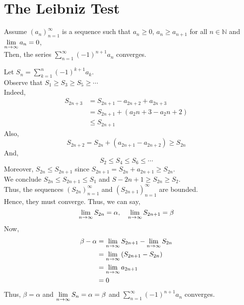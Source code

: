 \documentclass[12pt]{article}
\begin{document}
\section{The Leibniz Test}
\begin{theo}{}
Assume \(\left(a_n\right)_{n=1}^\infty\) is a sequence such that \(a_n \ge 0\), \(a_n \ge a_{n+1}\) for all \(n\in \mathbb N\) and \(\displaystyle\lim_{n\to\infty} a_n = 0\),\\
Then, the series \(\displaystyle\sum_{n=1}^\infty(-1)^{n+1}a_n\) converges.\\   
\end{theo}
\newpage
\begin{prf}{}
Let \(S_n  = \displaystyle\sum_{k=1}^n(-1)^{k+1}a_k\).\\
Observe that \(S_1 \ge S_3 \ge S_5 \ge \cdots\)\\
Indeed, 
\begin{align*}
    S_{2n+3} &= S_{2n+1} - a_{2n + 2} + a_{2n+3}\\
    &= S_{2n+1} + \left(a_2n+3 - a_2n+2\right)\\
    &\le S_{2n+1}
\end{align*}  
Also, \[S_{2n+2} = S_{2n} + \left(a_{2n+1} - a_{2n+2}\right) \ge S_{2n} \]
And, \[S_2 \le S_4 \le S_6 \le \cdots\]
Moreover, \(S_{2n} \le S_{2n+1}\) since \(S_{2n+1} = S_{2n} + a_{2n+1} \ge S_{2n}\).\\
We conclude \(S_{2n} \le S_{2n+1} \le S_1\) and \(S-{2n+1} \ge S_{2n} \ge S_{2}\).\\
Thus, the sequences \(\left(S_{2n}\right)_{n=1}^\infty\) and \(\left(S_{2n+1}\right)_{n=1}^\infty\) are bounded.\\
Hence, they must converge. Thus, we can say, 
\[\displaystyle\lim_{n\to\infty}S_{2n} = \alpha, \quad \displaystyle\lim_{n\to\infty}S_{2n+1} = \beta\]
Now, 
\begin{align*}
\beta -\alpha &= \displaystyle\lim_{n\to\infty}S_{2n+1} - \displaystyle\lim_{n\to\infty}S_{2n}\\
&= \displaystyle\lim_{n\to\infty}\left(S_{2n+1} - S_{2n}\right)\\
&= \displaystyle\lim_{n\to\infty}a_{2n+1}\\
&= 0
\end{align*}
Thus, \(\beta = \alpha\) and \(\displaystyle\lim_{n\to\infty}S_n = \alpha = \beta\) and \(\displaystyle\sum_{n=1}^\infty(-1)^{n+1}a_n\) converges.
\end{prf}
\newpage
\end{document}
